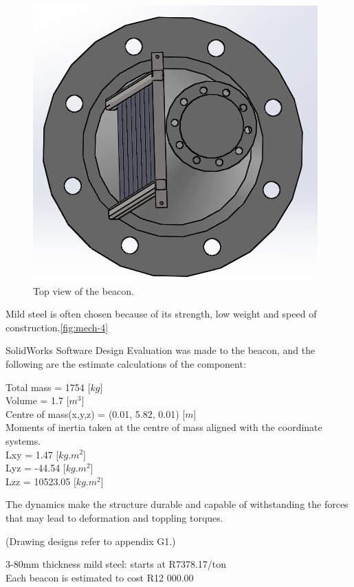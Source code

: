 \begin{figure}[H]
\begin{center}
\includegraphics[scale=0.3]{data/mechanical/7.png}
\caption{Top view of the beacon.}
\label{fig:mech-7}
\end{center}
\end{figure}

Mild steel is often chosen because of its strength, low weight and speed of construction.\ref{fig:mech-4}

SolidWorks Software Design Evaluation was made to the beacon, and the following are the estimate calculations of the component:
\begin{center}
Total mass = 1754 [$kg$]\\
Volume = 1.7 [$m^3$]\\
Centre of mass(x,y,z) = (0.01, 5.82, 0.01) [$m$]\\
Moments of inertia taken at the centre of mass aligned with the coordinate systems.\\
Lxy = 1.47 [$kg.m^2$]\\
Lyz = -44.54 [$kg.m^2$]\\
Lzz = 10523.05 [$kg.m^2$]
\end{center}

The dynamics make the structure durable and capable of withstanding the forces that may lead to deformation and toppling torques.

(Drawing designs refer to appendix G1.)

3-80mm thickness mild steel: starts at R7378.17/ton\\
Each beacon is estimated to cost R12 000.00

